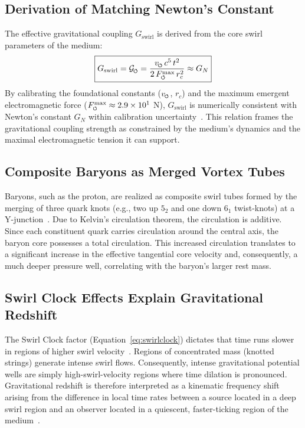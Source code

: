 \documentclass[10pt,reprint,aps,onecolumn,nofootinbib]{revtex4-2}
\newcommand{\bboxeq}[1]{\boxed{\displaystyle #1}}
\newcommand{\Fmaxswirl}{F^{\max}_{\mkern-1mu\scriptscriptstyle\boldsymbol{\circlearrowleft}}}
\begin{document}
        \subsection*{Derivation of Matching Newton's Constant}
            The effective gravitational coupling $G_\text{swirl}$ is derived from the core swirl parameters of the medium:
            \begin{equation}
                \bboxeq{
                    G_{\text{swirl}}
                    = \mathcal{G}_{\mkern-2mu\scriptscriptstyle\boldsymbol{\circlearrowleft}}
                    = \frac{v_{\mkern-2mu\scriptscriptstyle\boldsymbol{\circlearrowleft}} \, c^5 \, t^2}{2 \, \Fmaxswirl \, r_c^2}
                    \approx G_N
                }
                \label{eq:gswirl}
            \end{equation}
            By calibrating the foundational constants ($v_{\mkern-2mu\scriptscriptstyle\boldsymbol{\circlearrowleft}}$, $r_c$) and the maximum emergent electromagnetic force ($\Fmaxswirl \approx 2.9 \times 10^1$ N), $G_\text{swirl}$ is numerically consistent with Newton's constant $G_N$ within calibration uncertainty~\cite{sstCanon}. This relation frames the gravitational coupling strength as constrained by the medium’s dynamics and the maximal electromagnetic tension it can support.

        \subsection*{Composite Baryons as Merged Vortex Tubes}
            Baryons, such as the proton, are realized as composite swirl tubes formed by the merging of three quark knots (e.g., two up $5_2$ and one down $6_1$ twist-knots) at a Y-junction~\cite{chiralSwirl}. Due to Kelvin's circulation theorem, the circulation is additive. Since each constituent quark carries circulation around the central axis, the baryon core possesses a total circulation. This increased circulation translates to a significant increase in the effective tangential core velocity and, consequently, a much deeper pressure well, correlating with the baryon's larger rest mass.

        \subsection*{Swirl Clock Effects Explain Gravitational Redshift}
            The Swirl Clock factor (Equation~\ref{eq:swirlclock}) dictates that time runs slower in regions of higher swirl velocity~\cite{sstCanon}. Regions of concentrated mass (knotted strings) generate intense swirl flows. Consequently, intense gravitational potential wells are simply high-swirl-velocity regions where time dilation is pronounced. Gravitational redshift is therefore interpreted as a kinematic frequency shift arising from the difference in local time rates between a source located in a deep swirl region and an observer located in a quiescent, faster-ticking region of the medium~\cite{sstCanon}.
\end{document}
